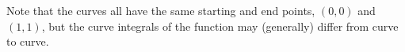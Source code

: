 \documentclass[11pt]{article}
\begin{document}
\begin{solution}
    Note that the curves all have the same starting and end points, $(0,0)$ and $(1,1)$, 
    but the curve integrals of the function may (generally) differ from curve to curve.  
\end{solution}
\end{document}
